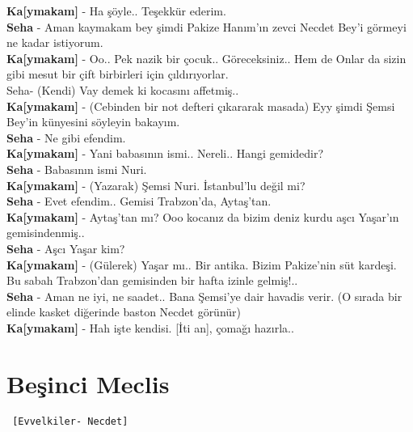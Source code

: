 \documentclass[]{book}
\begin{document}
\textbf{Ka{[}ymakam{]}} - Ha şöyle.. Teşekkür ederim.\\
\textbf{Seha} - Aman kaymakam bey şimdi Pakize Hanım'ın zevci Necdet Bey'i görmeyi ne kadar istiyorum.\\
\textbf{Ka{[}ymakam{]}} - Oo.. Pek nazik bir çocuk.. Göreceksiniz.. Hem de Onlar da sizin gibi mesut bir çift birbirleri için çıldırıyorlar.\\
Seha- (Kendi) Vay demek ki kocasını affetmiş..\\
\textbf{Ka{[}ymakam{]}} - (Cebinden bir not defteri çıkararak masada) Eyy şimdi Şemsi Bey'in künyesini söyleyin bakayım.\\
\textbf{Seha} - Ne gibi efendim.\\
\textbf{Ka{[}ymakam{]}} - Yani babasının ismi.. Nereli.. Hangi gemidedir?\\
\textbf{Seha} - Babasının ismi Nuri.\\
\textbf{Ka{[}ymakam{]}} - (Yazarak) Şemsi Nuri. İstanbul'lu değil mi?\\
\textbf{Seha} - Evet efendim.. Gemisi Trabzon'da, Aytaş'tan.\\
\textbf{Ka{[}ymakam{]}} - Aytaş'tan mı? Ooo kocanız da bizim deniz kurdu aşcı Yaşar'ın gemisindenmiş..\\
\textbf{Seha} - Aşcı Yaşar kim?\\
\textbf{Ka{[}ymakam{]}} - (Gülerek) Yaşar mı.. Bir antika. Bizim Pakize'nin süt kardeşi. Bu sabah Trabzon'dan gemisinden bir hafta izinle gelmiş!..\\
\textbf{Seha} - Aman ne iyi, ne saadet.. Bana Şemsi'ye dair havadis verir. (O sırada bir elinde kasket diğerinde baston Necdet görünür)\\
\textbf{Ka{[}ymakam{]}} - Hah işte kendisi. {[}İti an{]}, çomağı hazırla..\\

\hypertarget{besinci-meclis-1}{%
\section{Beşinci Meclis}\label{besinci-meclis-1}}

\begin{verbatim}
 [Evvelkiler- Necdet]
\end{verbatim}
\end{document}
